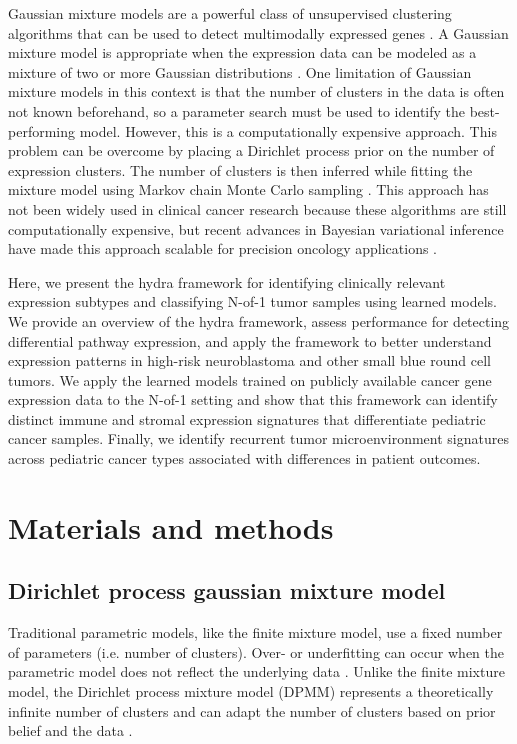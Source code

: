 \documentclass[10pt,letterpaper]{article}
\begin{document}
Gaussian mixture models are a powerful class of unsupervised clustering algorithms that can be used to detect multimodally expressed genes \cite{ghoshMixtureModelsAssessing2004,dahlModelBasedClusteringExpression2006,kimVariableSelectionClustering2006}. A Gaussian mixture model is appropriate when the expression data can be modeled as a mixture of two or more Gaussian distributions \cite{gelmanBayesianDataAnalysis2013}. One limitation of Gaussian mixture models in this context is that the number of clusters in the data is often not known beforehand, so a parameter search must be used to identify the best-performing model. However, this is a computationally expensive approach. This problem can be overcome by placing a Dirichlet process prior on the number of expression clusters. The number of clusters is then inferred while fitting the mixture model using Markov chain Monte Carlo sampling \cite{gelmanBayesianDataAnalysis2013}. This approach has not been widely used in clinical cancer research because these algorithms are still computationally expensive, but recent advances in Bayesian variational inference have made this approach scalable for precision oncology applications \cite{thallBayesianNonparametricStatistics2017}.

Here, we present the hydra framework for identifying clinically relevant expression subtypes and classifying N-of-1 tumor samples using learned models. We provide an overview of the hydra framework, assess performance for detecting differential pathway expression, and apply the framework to better understand expression patterns in high-risk neuroblastoma and other small blue round cell tumors. We apply the learned models trained on publicly available cancer gene expression data to the N-of-1 setting and show that this framework can identify distinct immune and stromal expression signatures that differentiate pediatric cancer samples. Finally, we identify recurrent tumor microenvironment signatures across pediatric cancer types associated with differences in patient outcomes.

\section*{Materials and methods}
\subsection*{Dirichlet process gaussian mixture model}
Traditional parametric models, like the finite mixture model, use a fixed number of parameters (i.e. number of clusters). Over- or underfitting can occur when the parametric model does not reflect the underlying data \cite{teh2010dirichlet}. Unlike the finite mixture model, the Dirichlet process mixture model (DPMM) represents a theoretically infinite number of clusters and can adapt the number of clusters based on prior belief and the data \cite{gelmanBayesianDataAnalysis2013, antoniakMixturesDirichletProcesses1974, teh2010dirichlet}.
\end{document}
